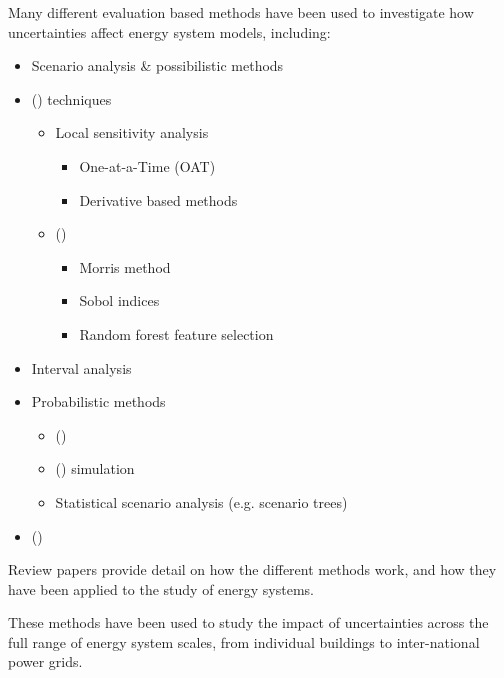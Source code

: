 Many different evaluation based methods have been used to investigate how uncertainties affect energy system models, including:

\begin{itemize}
    \item Scenario analysis \& possibilistic methods
    \item {} () techniques
        \begin{itemize}
            \item Local sensitivity analysis
                \begin{itemize}
                    \item One-at-a-Time (OAT)
                    \item Derivative based methods
                \end{itemize}
            \item {} ()
                \begin{itemize}
                    \item Morris method
                    \item Sobol indices
                    \item Random forest feature selection
                \end{itemize}
        \end{itemize}
    \item Interval analysis
    \item Probabilistic methods
        \begin{itemize}
            \item {} ()
            \item {} () simulation
            \item Statistical scenario analysis (e.g. scenario trees)
        \end{itemize}
    \item {} ()
\end{itemize}

Review papers  provide detail on how the different methods work, and how they have been applied to the study of energy systems.

These methods have been used to study the impact of uncertainties across the full range of energy system scales, from individual buildings to inter-national power grids.

